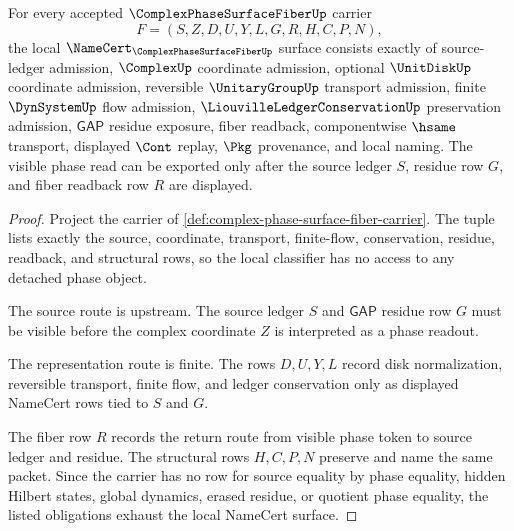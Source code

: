 \begin{theorem}
\label{thm:complex-phase-surface-fiber-namecert-obligations}
For every accepted $\ComplexPhaseSurfaceFiberUp$ carrier
$$
F=(S,Z,D,U,Y,L,G,R,H,C,P,N),
$$
the local $\NameCert_{\ComplexPhaseSurfaceFiberUp}$ surface consists exactly of source-ledger admission, $\ComplexUp$ coordinate admission, optional $\UnitDiskUp$ coordinate admission, reversible $\UnitaryGroupUp$ transport admission, finite $\DynSystemUp$ flow admission, $\LiouvilleLedgerConservationUp$ preservation admission, $\mathsf{GAP}$ residue exposure, fiber readback, componentwise $\hsame$ transport, displayed $\Cont$ replay, $\Pkg$ provenance, and local naming. The visible phase read can be exported only after the source ledger $S$, residue row $G$, and fiber readback row $R$ are displayed.
\end{theorem}
\begin{proof}
Project the carrier of \autoref{def:complex-phase-surface-fiber-carrier}. The tuple lists exactly the source, coordinate, transport, finite-flow, conservation, residue, readback, and structural rows, so the local classifier has no access to any detached phase object.

The source route is upstream. The source ledger $S$ and $\mathsf{GAP}$ residue row $G$ must be visible before the complex coordinate $Z$ is interpreted as a phase readout.

The representation route is finite. The rows $D,U,Y,L$ record disk normalization, reversible transport, finite flow, and ledger conservation only as displayed NameCert rows tied to $S$ and $G$.

The fiber row $R$ records the return route from visible phase token to source ledger and residue. The structural rows $H,C,P,N$ preserve and name the same packet. Since the carrier has no row for source equality by phase equality, hidden Hilbert states, global dynamics, erased residue, or quotient phase equality, the listed obligations exhaust the local NameCert surface.
\end{proof}

